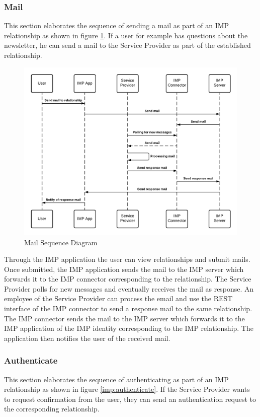 \subsubsection{Mail}
This section elaborates the sequence of sending a mail as part of an IMP relationship as shown in figure \ref{imp:mail}.
If a user for example has questions about the newsletter, he can send a mail to the Service Provider as part of the established relationship.

\begin{figure}[h!]
    \centering
    \includegraphics[scale=0.6]{Diagrams/IMP Use Case Mail Sequence Diagram.pdf}
    \caption{Mail Sequence Diagram}
    \label{imp:mail}
\end{figure}

Through the IMP application the user can view relationships and submit mails. Once submitted, the IMP application sends the mail to the IMP server which forwards it to the IMP connector corresponding to the relationship. The Service Provider polls for new messages and eventually receives the mail as response. An employee of the Service Provider can process the email and use the REST interface of the IMP connector to send a response mail to the same relationship. The IMP connector sends the mail to the IMP server which forwards it to the IMP application of the IMP identity corresponding to the IMP relationship. The application then notifies the user of the received mail.

\subsubsection{Authenticate}
This section elaborates the sequence of authenticating as part of an IMP relationship as shown in figure \ref{imp:authenticate}.
If the Service Provider wants to request confirmation from the user, they can send an authentication request to the corresponding relationship.

